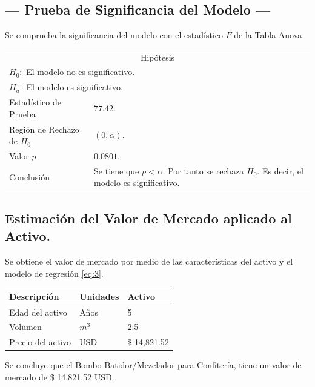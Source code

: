 \subsection{\centering --- Prueba de Significancia del Modelo ---} %
Se comprueba la significancia del modelo con el estadístico \(F\) de la Tabla Anova.
\begin{center}
  \begin{tabular}{|l|p{6cm}|}
    \cline{1-2}
    \multicolumn{2}{|c|}{Hipótesis}\\ \cline{1-2}
    \multicolumn{2}{|l|}{\(H_0:\) El modelo no es significativo.} \\ 
    \multicolumn{2}{|l|}{\(H_a:\) El modelo es significativo.} \\ \cline{1-2}
    Estadístico de Prueba & \(77.42\).\\ \cline{1-2} 
		Región de Rechazo de \(H_0\) & \((0, \alpha )\).\\ \cline{1-2} 
    Valor \(p\) & \(0.0801\).\\ \cline{1-2} 
    Conclusión & Se tiene que \(p<\alpha\). \newline 
		Por tanto se rechaza \(H_0\). \newline 
		Es decir, el modelo es significativo.\\ \cline{1-2} 
  \end{tabular}
\end{center} 

\subsection{\centering Estimación del Valor de Mercado aplicado al Activo.} %
Se obtiene el valor de mercado por medio de las características del activo y el modelo de regresión \eqref{eq:3}.
\begin{center}
  \begin{tabular}{|l|l|l|}
    \hline 
		Descripción   & Unidades  & Activo \\ \hline 
    Edad del activo    & Años      & 5      \\ \hline 
		Volumen  & \(m ^ 3\) & 2.5   \\ \hline 
		Precio del activo   & USD       & \$ 14,821.52  \\ \hline 
  \end{tabular}
\end{center} 
Se concluye que el Bombo Batidor/Mezclador para Confitería, tiene un valor de mercado de 
\$ 14,821.52  USD.

